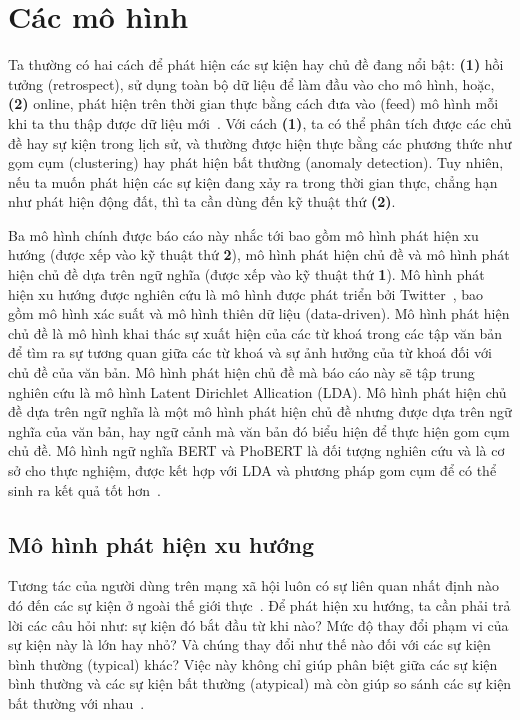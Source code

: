 \chapter{Các mô hình}
\label{sec:models}

Ta thường có hai cách để phát hiện các sự kiện hay chủ đề đang nổi bật:
\textbf{(1)} hồi tưởng (retrospect), sử dụng toàn bộ dữ liệu để làm đầu vào cho
mô hình, hoặc, \textbf{(2)} online, phát hiện trên thời gian thực bằng cách đưa
vào (feed) mô hình mỗi khi ta thu thập được dữ liệu
mới~\cite{lauOnlineTrendAnalysis2012}. Với cách \textbf{(1)}, ta có thể phân
tích được các chủ đề hay sự kiện trong lịch sử, và thường được hiện thực bằng
các phương thức như gọm cụm (clustering) hay phát hiện bất thường (anomaly
detection). Tuy nhiên, nếu ta muốn phát hiện các sự kiện đang xảy ra trong thời
gian thực, chẳng hạn như phát hiện động đất, thì ta cần dùng đến kỹ thuật thứ
\textbf{(2)}.

Ba mô hình chính được báo cáo này nhắc tới bao gồm mô hình phát hiện xu hướng
(được xếp vào kỹ thuật thứ \textbf{2}), mô hình phát hiện chủ đề và mô hình
phát hiện chủ đề dựa trên ngữ nghĩa (được xếp vào kỹ thuật thứ \textbf{1}).  Mô
hình phát hiện xu hướng được nghiên cứu là mô hình được phát triển bởi
Twitter~\cite{hendricksonTrendDetectionSocial2015}, bao gồm mô hình xác suất và
mô hình thiên dữ liệu (data-driven). Mô hình phát hiện chủ đề là mô hình khai
thác sự xuất hiện của các từ khoá trong các tập văn bản để tìm ra sự tương quan
giữa các từ khoá và sự ảnh hưởng của từ khoá đối với chủ đề của văn bản. Mô
hình phát hiện chủ đề mà báo cáo này sẽ tập trung nghiên cứu là mô hình Latent
Dirichlet Allication (LDA). Mô hình phát hiện chủ đề dựa trên ngữ nghĩa là một
mô hình phát hiện chủ đề nhưng được dựa trên ngữ nghĩa của văn bản, hay ngữ
cảnh mà văn bản đó biểu hiện để thực hiện gom cụm chủ đề. Mô hình ngữ nghĩa
BERT và PhoBERT là đối tượng nghiên cứu và là cơ sở cho thực nghiệm, được kết
hợp với LDA và phương pháp gom cụm để có thể sinh ra kết quả tốt
hơn~\cite{lamGomCumVan2021}.



\section{Mô hình phát hiện xu hướng}
Tương tác của người dùng trên mạng xã hội luôn có sự liên quan nhất định nào đó
đến các sự kiện ở ngoài thế giới
thực~\cite{hendricksonTrendDetectionSocial2015}. Để phát hiện xu hướng, ta cần
phải trả lời các câu hỏi như: sự kiện đó bắt đầu từ khi nào? Mức độ thay đổi
phạm vi của sự kiện này là lớn hay nhỏ? Và chúng thay đổi như thế nào đối với
các sự kiện bình thường (typical) khác? Việc này không chỉ giúp phân biệt giữa
các sự kiện bình thường và các sự kiện bất thường (atypical) mà còn giúp so
sánh các sự kiện bất thường với
nhau~\cite{hendricksonTrendDetectionSocial2015}.

